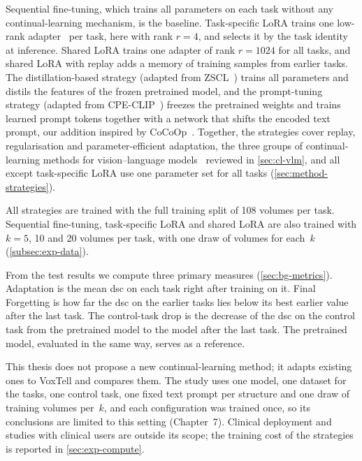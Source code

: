 Sequential fine-tuning, which trains all parameters on each task without any continual-learning mechanism, is the baseline.
Task-specific LoRA trains one low-rank adapter~\cite{hu2022lora} per task, here with rank $r = 4$, and selects it by the task identity at inference.
Shared LoRA trains one adapter of rank $r = 1024$ for all tasks, and shared LoRA with replay adds a memory of training samples from earlier tasks.
The distillation-based strategy (adapted from ZSCL~\cite{zheng2023preventingzeroshottransferdegradation}) trains all parameters and distils the features of the frozen pretrained model, and the prompt-tuning strategy (adapted from CPE-CLIP~\cite{D_Alessandro_2023}) freezes the pretrained weights and trains learned prompt tokens together with a network that shifts the encoded text prompt, our addition inspired by CoCoOp~\cite{zhou2022cocoop}.
Together, the strategies cover replay, regularisation and parameter-efficient adaptation, the three groups of continual-learning methods for vision--language models~\cite[Sec.~4]{liu2026continuallearningvlmssurvey} reviewed in \cref{sec:cl-vlm}, and all except task-specific LoRA use one parameter set for all tasks (\cref{sec:method-strategies}).

All strategies are trained with the full training split of 108 volumes per task.
Sequential fine-tuning, task-specific LoRA and shared LoRA are also trained with $k = 5$, 10 and 20 volumes per task, with one draw of volumes for each~$k$ (\cref{subsec:exp-data}).

From the test results we compute three primary measures (\cref{sec:bg-metrics}).
Adaptation is the mean \gls{dsc} on each task right after training on it.
Final Forgetting is how far the \gls{dsc} on the earlier tasks lies below its best earlier value after the last task.
The control-task drop is the decrease of the \gls{dsc} on the control task from the pretrained model to the model after the last task.
The pretrained model, evaluated in the same way, serves as a reference.

This thesis does not propose a new continual-learning method; it adapts existing ones to VoxTell and compares them.
The study uses one model, one dataset for the tasks, one control task, one fixed text prompt per structure and one draw of training volumes per~$k$, and each configuration was trained once, so its conclusions are limited to this setting (Chapter~7).
Clinical deployment and studies with clinical users are outside its scope; the training cost of the strategies is reported in \cref{sec:exp-compute}.

